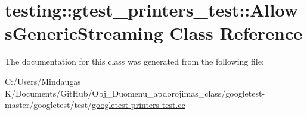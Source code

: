 \hypertarget{classtesting_1_1gtest__printers__test_1_1_allows_generic_streaming}{}\section{testing\+::gtest\+\_\+printers\+\_\+test\+::Allows\+Generic\+Streaming Class Reference}
\label{classtesting_1_1gtest__printers__test_1_1_allows_generic_streaming}


The documentation for this class was generated from the following file\+:\begin{DoxyCompactItemize}
\item 
C\+:/\+Users/\+Mindaugas K/\+Documents/\+Git\+Hub/\+Obj\+\_\+\+Duomenu\+\_\+apdorojimas\+\_\+class/googletest-\/master/googletest/test/\mbox{\hyperlink{googletest-master_2googletest_2test_2googletest-printers-test_8cc}{googletest-\/printers-\/test.\+cc}}\end{DoxyCompactItemize}
